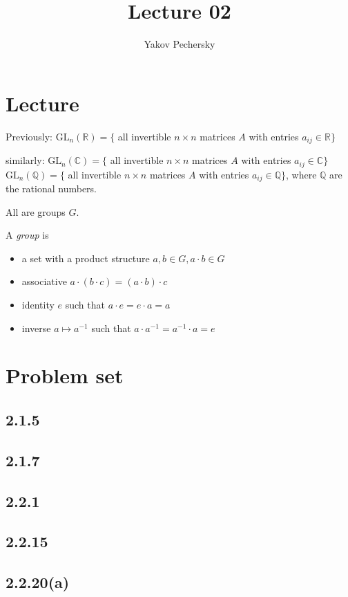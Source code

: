 \documentclass[12pt]{article}
\newcommand{\RR}{\mathbb{R}}
\newcommand{\GL}{\text{GL}}
\newcommand{\inv}[1]{#1^{-1}}
\theoremstyle{definition}
\begin{document}
\author{Yakov Pechersky}

\title{Lecture 02}

\maketitle

\section*{Lecture}

Previously: \(\GL_n(\RR) = \{\) all invertible \(n \times n\) matrices \(A\) with entries \(a_{ij} \in \RR\}\)

similarly: \(\GL_n(\mathbb{C}) = \{\) all invertible \(n \times n\) matrices \(A\) with entries \(a_{ij} \in \mathbb{C}\}\)
\(\GL_n(\mathbb{Q}) = \{\) all invertible \(n \times n\) matrices \(A\) with entries \(a_{ij} \in \mathbb{Q}\}\),
where \(\mathbb{Q}\) are the rational numbers.

All are groups \(G\).

A \emph{group} is \begin{itemize} \setlength\itemsep{0em}
    \item a set with a product structure \(a, b \in G, a \cdot b \in G\)
    \item associative \(a \cdot (b \cdot c) = (a \cdot b) \cdot c\)
    \item identity \(e\) such that \(a \cdot e = e \cdot a = a\)
    \item inverse \(a \mapsto \inv{a}\) such that \(a \cdot \inv{a} = \inv{a} \cdot a = e\)
\end{itemize}

\section*{Problem set}
\subsection*{2.1.5}
\subsection*{2.1.7}
\subsection*{2.2.1}
\subsection*{2.2.15}
\subsection*{2.2.20(a)}
\end{document}
